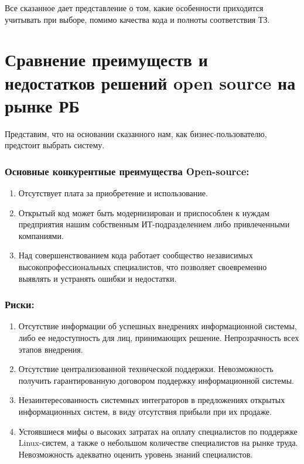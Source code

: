 \documentclass[10pt, a5paper]{article}
\begin{document}
Все сказанное дает представление о том, какие особенности приходится учитывать при выборе, помимо качества кода и полноты соответствия ТЗ.

\section*{Сравнение преимуществ и недостатков решений open source на рынке РБ}

Представим, что на основании сказанного нам, как бизнес-пользователю,  предстоит выбрать систему.

\subsubsection*{Основные конкурентные преимущества Open-source:}

\begin{enumerate}
  \item Отсутствует плата за приобретение и использование.
  \item Открытый код может быть модернизирован и приспособлен к нуждам предприятия нашим собственным ИТ-подразделением либо привлеченными компаниями.
  \item Над совершенствованием кода работает сообщество независимых высокопрофессиональных специалистов, что позволяет своевременно выявлять и устранять ошибки и недостатки.
\end{enumerate}

\subsubsection*{Риски:}

\begin{enumerate}
  \item Отсутствие информации об успешных внедрениях информационной системы, либо ее недоступность для лиц, принимающих решение. Непрозрачность всех этапов внедрения.
  \item Отсутствие централизованной технической поддержки. Невозможность получить гарантированную договором поддержку информационной системы.
  \item Незаинтересованность системных интеграторов в предложениях открытых информационных систем, в виду отсутствия прибыли при их продаже.
  \item Устоявшиеся мифы о высоких затратах на оплату специалистов по поддержке Linux-систем, а также о небольшом количестве специалистов на рынке труда. Невозможность адекватно оценить уровень знаний специалистов.
\end{enumerate}
\end{document}
